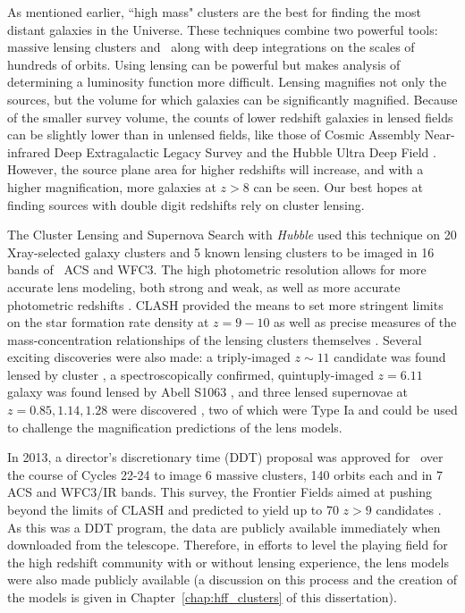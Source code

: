 As mentioned earlier, ``high mass" clusters are the best for finding the most distant galaxies in the Universe. These techniques combine two powerful tools: massive lensing clusters and \hst\ along with deep integrations on the scales of hundreds of orbits. Using lensing can be powerful but makes analysis of determining a luminosity function more difficult. Lensing magnifies not only the sources, but the volume for which galaxies can be significantly magnified. Because of the smaller survey volume, the counts of lower redshift galaxies in lensed fields can be slightly lower than in unlensed fields, like those of Cosmic Assembly Near-infrared Deep Extragalactic Legacy Survey \citep[CANDELS; ][]{Grogin:2011ly} and the Hubble Ultra Deep Field \citep{Beckwith:2006rt}. However, the source plane area for higher redshifts will increase, and with a higher magnification, more galaxies at $z>8$ can be seen. Our best hopes at finding sources with double digit redshifts rely on cluster lensing.

The Cluster Lensing and Supernova Search with {\it Hubble} \citep[CLASH; ][]{Postman:2012lr} used this technique on 20 Xray-selected galaxy clusters and 5 known lensing clusters to be imaged in 16 bands of \hst\ ACS and WFC3. The high photometric resolution allows for more accurate lens modeling, both strong and weak, as well as more accurate photometric redshifts \citep{Jouvel:2014qy}. CLASH provided the means to set more stringent limits on the star formation rate density at $z=9-10$ \citep{Bouwens:2014zp} as well as precise measures of the mass-concentration relationships of the lensing clusters themselves \citep{Merten:2015rz,Meneghetti:2014ys}. Several exciting discoveries were also made: a triply-imaged $z\sim11$ candidate was found lensed by cluster \citep{Coe:2013tg}, a spectroscopically confirmed, quintuply-imaged $z=6.11$ galaxy was found lensed by Abell S1063 \citep{Monna:2014lr,Balestra:2013uq}, and three lensed supernovae at $z=0.85,1.14,1.28$ were discovered \citep{Patel:2014kl}, two of which were Type Ia and could be used to challenge the magnification predictions of the lens models.

In 2013, a director's discretionary time (DDT) proposal was approved for \hst\ over the course of Cycles 22-24 to image 6 massive clusters, 140 orbits each and in 7 ACS and WFC3/IR bands. This survey, the Frontier Fields \citep{Lotz:2017gd} aimed at pushing beyond the limits of CLASH and predicted to yield up to 70 $z>9$ candidates \citep{Coe:2015qf}. As this was a DDT program, the data are publicly available immediately when downloaded from the telescope. Therefore, in efforts to level the playing field for the high redshift community with or without lensing experience, the lens models were also made publicly available (a discussion on this process and the creation of the models is given in Chapter~\ref{chap:hff_clusters} of this dissertation).

